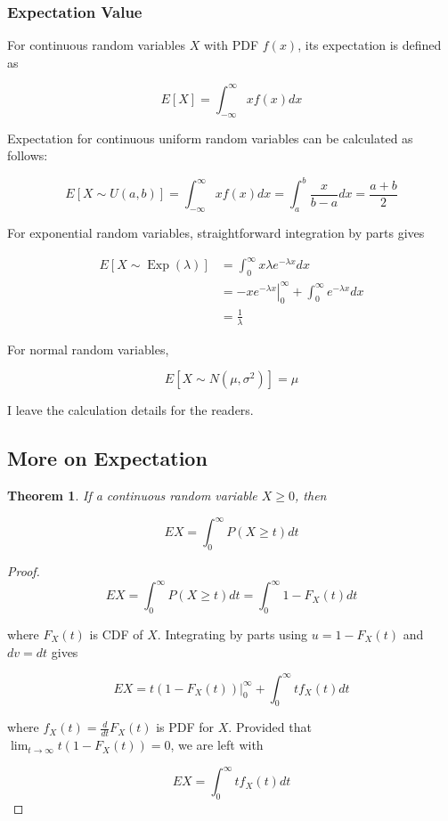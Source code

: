 \documentclass[12pt, a4paper]{article}
\newcommand{\Exp}{\operatorname{Exp}}
\newtheorem*{theorem}{Theorem}
\begin{document}
\subsubsection{Expectation Value}

For continuous random variables $X$ with PDF $f(x)$, its expectation is defined as

$$E[X]=\int_{-\infty}^\infty xf(x) dx$$

Expectation for continuous uniform random variables can be calculated as follows:

$$E[X\sim U(a,b)]=\int_{-\infty}^\infty xf(x) dx=\int_a^b \frac{x}{b-a} dx=\frac{a+b}{2}$$

For exponential random variables, straightforward integration by parts gives

\begin{align*}
E[X\sim\Exp(\lambda)]&=\int_0^\infty x\lambda e^{-\lambda x} dx \\
&=\left. -xe^{-\lambda x} \right\vert_0^\infty + \int_0^\infty e^{-\lambda x} dx \\
&=\frac{1}{\lambda}
\end{align*}

For normal random variables,

$$E[X\sim N(\mu, \sigma^2)]=\mu$$

I leave the calculation details for the readers. \\

\subsection{More on Expectation}

\begin{theorem}
If a continuous random variable $X \ge 0$, then

\[ EX=\int_0^\infty P(X\ge t) dt \]
\end{theorem}

\begin{proof}
\[ EX = \int_0^\infty P(X\ge t) dt = \int_0^\infty 1-F_X(t) dt \]

where $F_X(t)$ is CDF of $X$. Integrating by parts using $u=1-F_X(t)$ and $dv=dt$ gives

\[ EX = \left. t (1-F_X(t)) \right\vert_0^\infty + \int_0^\infty t f_X(t) dt \]

where $f_X(t)=\frac{d}{dt}F_X(t)$ is PDF for $X$. Provided that $\lim_{t\to\infty} t (1-F_X(t)) = 0$, we are left with

\[ EX = \int_0^\infty t f_X(t) dt \]
\end{proof}
\end{document}
